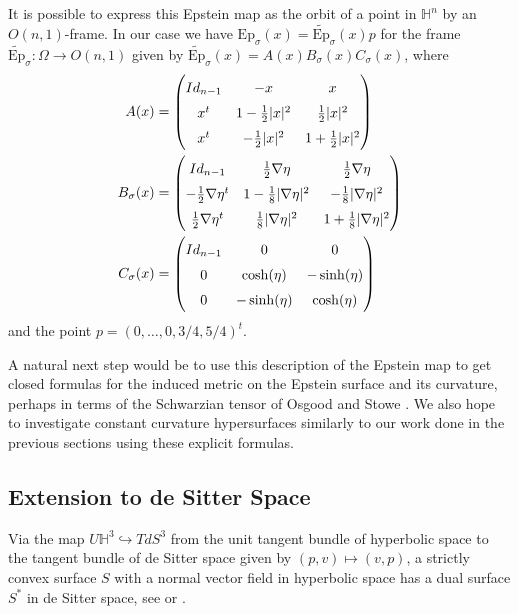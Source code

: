 \documentclass[11pt]{amsart}
\renewcommand{\H}{\mathbb{H}}
\begin{document}
It is possible to express this Epstein map as the orbit of a point in $\H^n$ by an $O(n,1)$-frame.
In our case we have $\mathrm{Ep}_\sigma(x) = \widetilde{\mathrm{Ep}}_\sigma(x)p$ for the frame $\widetilde{\mathrm{Ep}}_\sigma: \Omega \to O(n,1)$ given by $\widetilde{\mathrm{Ep}}_\sigma(x) = A(x) B_\sigma(x) C_\sigma(x)$, where 
\begin{align*}
A(x) &= \def\arraystretch{1.5}\begin{pmatrix}
Id_{n-1} & -x & x \\
x^t & 1- \frac{1}{2}|x|^2 & \frac{1}{2} |x|^2 \\
x^t & -\frac{1}{2}|x|^2 & 1 + \frac{1}{2} |x|^2
\end{pmatrix} \\ 
B_\sigma(x) &= 
\def\arraystretch{1.5}
\begin{pmatrix}
Id_{n-1} & \frac{1}{2} \nabla\eta  & \frac{1}{2}\nabla\eta \\
-\frac{1}{2} \nabla\eta^t & 1-\frac{1}{8} |\nabla\eta|^2 & -\frac{1}{8} |\nabla\eta|^2 \\
\frac{1}{2}\nabla\eta^t & \frac{1}{8} |\nabla\eta|^2 & 1 + \frac{1}{8} |\nabla\eta|^2 
\end{pmatrix} \\
C_\sigma(x) &= 
\def\arraystretch{1.5}
\begin{pmatrix}
Id_{n-1} & 0 & 0 \\
0 & \cosh(\eta) & -\sinh(\eta) \\
0 & -\sinh(\eta) & \cosh(\eta) 
\end{pmatrix}
\end{align*}
and the point $p = (0, \ldots, 0 , 3/4,5/4)^t$.

A natural next step would be to use this description of the Epstein map to get closed formulas for the induced metric on the Epstein surface and its curvature, perhaps in terms of the Schwarzian tensor of Osgood and Stowe \cite{osgood-stowe1992}.
We also hope to investigate constant curvature hypersurfaces similarly to our work done in the previous sections using these explicit formulas. 



\subsection{Extension to de Sitter Space}
Via the map $U\H^3 \hookrightarrow T dS^3$ from the unit tangent bundle of hyperbolic space to the tangent bundle of de Sitter space given by $(p,v) \mapsto (v,p)$, a strictly convex surface $S$ with a normal vector field in hyperbolic space has a dual surface $S^*$ in de Sitter space, see \cite{hodgson-rivin1993} or \cite{schlenker2002}. 
\end{document}
